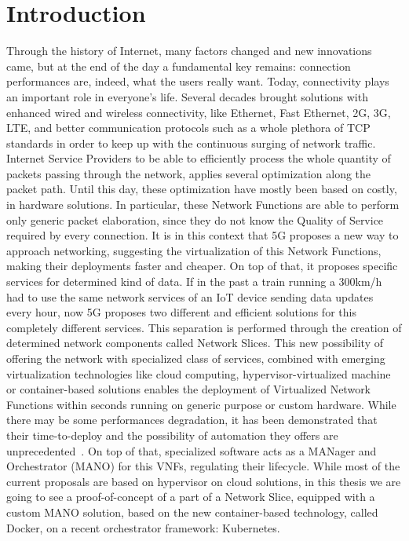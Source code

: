 \chapter{Introduction}
\label{chap:intro}

Through the history of Internet, many factors changed and new innovations came,
but at the end of the day a fundamental key remains: connection performances
are, indeed, what the users really want. Today, connectivity plays an important
role in everyone's life. Several decades brought solutions with enhanced wired
and wireless connectivity, like Ethernet, Fast Ethernet, 2G, 3G, LTE, and better
communication protocols such as a whole plethora of TCP standards in order to
keep up with the continuous surging of network traffic. Internet Service
Providers to be able to efficiently process the whole quantity of packets
passing through the network, applies several optimization along the packet path.
Until this day, these optimization have mostly been based on costly, in hardware
solutions. In particular, these Network Functions are able to perform only
generic packet elaboration, since they do not know the Quality of Service
required by every connection. It is in this context that 5G proposes a new way
to approach networking, suggesting the virtualization of this Network Functions,
making their deployments faster and cheaper. On top of that, it proposes
specific services for determined kind of data. If in the past a train running a
300km/h had to use the same network services of an IoT device sending data
updates every hour, now 5G proposes two different and efficient solutions for
this completely different services. This separation is performed through the
creation of determined network components called Network Slices. This new
possibility of offering the network with specialized class of services, combined
with emerging virtualization technologies like cloud computing,
hypervisor-virtualized machine or container-based solutions enables the
deployment of Virtualized Network Functions within seconds running on generic
purpose or custom hardware. While there may be some performances degradation,
it has been demonstrated that their time-to-deploy and the possibility of
automation they offers are unprecedented~\cite{nguyen2017sdn}. On top of that,
specialized software acts as a MANager and Orchestrator (MANO) for this VNFs,
regulating their lifecycle. While most of the current proposals are based on
hypervisor on cloud solutions, in this thesis we are going to see a
proof-of-concept of a part of a Network Slice, equipped with a custom MANO
solution, based on the new container-based technology, called Docker, on a
recent orchestrator framework: Kubernetes.
 
